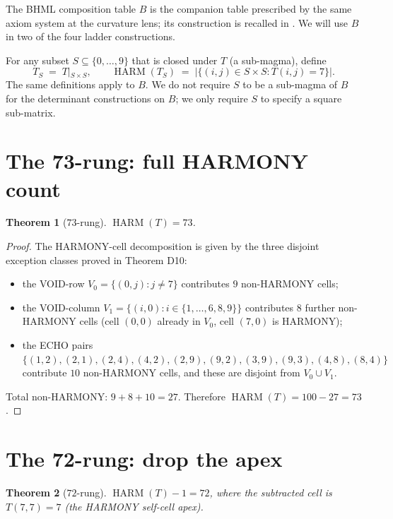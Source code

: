 \documentclass[11pt,reqno]{amsart}
\newtheorem{theorem}{Theorem}[section]
\theoremstyle{definition}
\DeclareMathOperator{\HARM}{HARM}
\begin{document}
The BHML composition table $B$ is the companion table prescribed by
the same axiom system at the curvature lens; its construction is
recalled in \cite{Sanders2026LensInvariance}. We will use $B$ in two
of the four ladder constructions.

For any subset $S \subseteq \{0, \ldots, 9\}$ that is closed under
$T$ (a sub-magma), define
\[
  T_S \;=\; T |_{S \times S},\qquad
  \HARM(T_S) \;=\; |\{(i, j) \in S \times S : T(i, j) = 7\}|.
\]
The same definitions apply to $B$. We do not require $S$ to be a
sub-magma of $B$ for the determinant constructions on $B$; we only
require $S$ to specify a square sub-matrix.

\section{The 73-rung: full HARMONY count}
\label{sec:73}

\begin{theorem}[$73$-rung]
\label{thm:73}
$\HARM(T) = 73$.
\end{theorem}

\begin{proof}
The HARMONY-cell decomposition is given by the three disjoint
exception classes proved in \cite{Sanders2026CLAxioms} Theorem D10:
\begin{itemize}[leftmargin=*]
\item the VOID-row $V_0 = \{(0, j) : j \neq 7\}$ contributes $9$ non-HARMONY cells;
\item the VOID-column $V_1 = \{(i, 0) : i \in \{1,\ldots,6,8,9\}\}$ contributes $8$ further non-HARMONY cells (cell $(0,0)$ already in $V_0$, cell $(7,0)$ is HARMONY);
\item the ECHO pairs $\{(1,2),(2,1),(2,4),(4,2),(2,9),(9,2),(3,9),(9,3),(4,8),(8,4)\}$ contribute $10$ non-HARMONY cells, and these are disjoint from $V_0 \cup V_1$.
\end{itemize}
Total non-HARMONY: $9 + 8 + 10 = 27$. Therefore
$\HARM(T) = 100 - 27 = 73$.
\end{proof}

\section{The 72-rung: drop the apex}
\label{sec:72}

\begin{theorem}[$72$-rung]
\label{thm:72}
$\HARM(T) - 1 = 72$, where the subtracted cell is $T(7, 7) = 7$
(the HARMONY self-cell apex).
\end{theorem}
\end{document}
